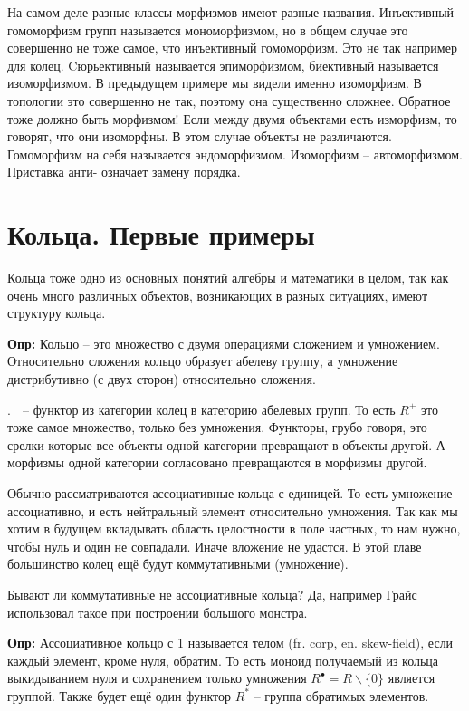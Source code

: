 На самом деле разные классы морфизмов имеют разные названия. Инъективный
гомоморфизм групп называется мономорфизмом, но в общем случае это совершенно
не тоже самое, что инъективный гомоморфизм. Это не так например для колец.
Cюрьективный называется эпиморфизмом, биективный называется изоморфизмом. В
предыдущем примере мы видели именно изоморфизм. В топологии это совершенно не
так, поэтому она существенно сложнее. Обратное тоже должно быть морфизмом! Если
между двумя объектами есть изморфизм, то говорят, что они изоморфны. В этом
случае объекты не различаются. Гомоморфизм на себя называется эндоморфизмом.
Изоморфизм – автоморфизмом. Приставка анти- означает замену порядка.

\section{Кольца. Первые примеры}

Кольца тоже одно из основных понятий алгебры и математики в целом, так как
очень много различных объектов, возникающих в разных ситуациях, имеют структуру
кольца.

\textbf{Опр:} Кольцо – это множество с двумя операциями сложением и умножением.
Относительно сложения кольцо образует абелеву группу, а умножение дистрибутивно
(с двух сторон) относительно сложения.

$.^+$ – функтор из категории колец в категорию абелевых групп. То есть $R^+$
это тоже самое множество, только без умножения. Функторы, грубо говоря, это
срелки которые все объекты одной категории превращают в объекты другой. А
морфизмы одной категории согласовано превращаются в морфизмы другой.

Обычно рассматриваются ассоциативные кольца с единицей. То есть умножение
ассоциативно, и есть нейтральный элемент относительно умножения. Так как мы
хотим в будущем вкладывать область целостности в поле частных, то нам нужно,
чтобы нуль и один не совпадали. Иначе вложение не удастся. В этой главе
большинство колец ещё будут коммутативными (умножение).

Бывают ли коммутативные не ассоциативные кольца? Да, например Грайс использовал
такое при построении большого монстра.

\textbf{Опр:} Ассоциативное кольцо с 1 называется телом (fr. corp, en. skew-field),
если каждый элемент, кроме нуля, обратим. То есть моноид получаемый из кольца
выкидыванием нуля и сохранением только умножения $R^\bullet = R\backslash\{0\}$ является
группой. Также будет ещё один функтор $R^*$ – группа обратимых элементов.

